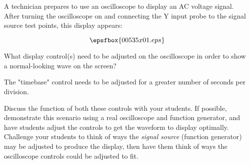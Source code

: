 

A technician prepares to use an oscilloscope to display an AC voltage signal.  After turning the oscilloscope on and connecting the Y input probe to the signal source test points, this display appears:

$$\epsfbox{00535x01.eps}$$

What display control(s) need to be adjusted on the oscilloscope in order to show a normal-looking wave on the screen?







The "timebase" control needs to be adjusted for a greater number of seconds per division.







Discuss the function of both these controls with your students.  If possible, demonstrate this scenario using a real oscilloscope and function generator, and have students adjust the controls to get the waveform to display optimally.  Challenge your students to think of ways the {\it signal source} (function generator) may be adjusted to produce the display, then have them think of ways the oscilloscope controls could be adjusted to fit.




